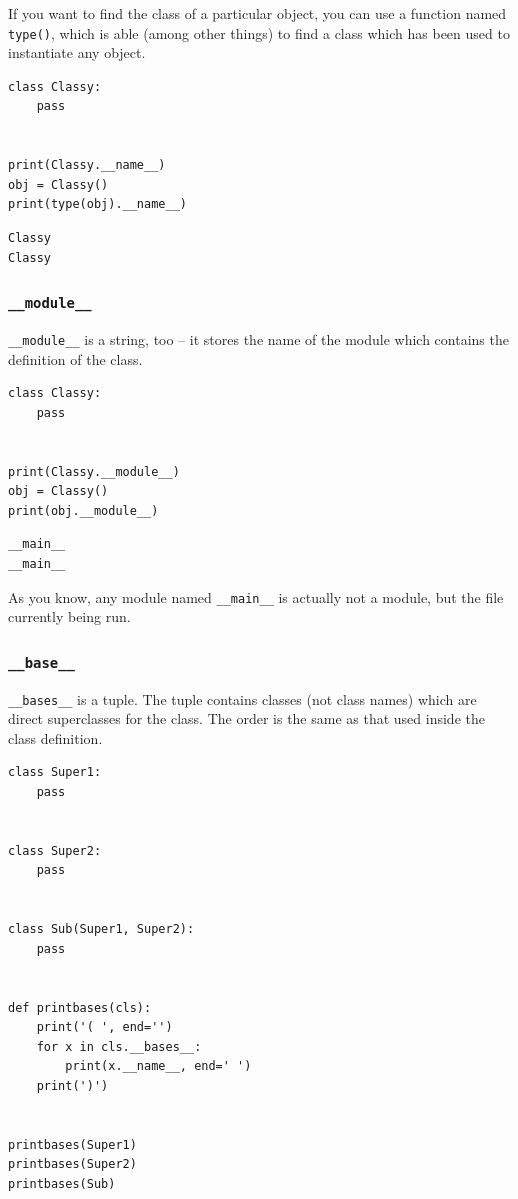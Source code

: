 \documentclass[11pt]{article}
\begin{document}
If you want to find the class of a particular object, you can use a
function named \texttt{type()}, which is able (among other things) to find a
class which has been used to instantiate any object.

\begin{verbatim}
class Classy:
	pass


print(Classy.__name__)
obj = Classy()
print(type(obj).__name__)
\end{verbatim}

\begin{verbatim}
Classy
Classy
\end{verbatim}

\subsubsection{\texttt{\_\_module\_\_}}
\label{sec:org5764cc4}
\texttt{\_\_module\_\_} is a string, too – it stores the name of the module which
contains the definition of the class.

\begin{verbatim}
class Classy:
    pass


print(Classy.__module__)
obj = Classy()
print(obj.__module__)
\end{verbatim}

\begin{verbatim}
__main__
__main__
\end{verbatim}

As you know, any module named \texttt{\_\_main\_\_} is actually not a module, but
the file currently being run.

\subsubsection{\texttt{\_\_base\_\_}}
\label{sec:orgca5a5ce}
\texttt{\_\_bases\_\_} is a tuple. The tuple contains classes (not class names)
which are direct superclasses for the class. The order is the same as
that used inside the class definition.

\begin{verbatim}
class Super1:
	pass


class Super2:
	pass


class Sub(Super1, Super2):
	pass


def printbases(cls):
	print('( ', end='')
	for x in cls.__bases__:
		print(x.__name__, end=' ')
	print(')')


printbases(Super1)
printbases(Super2)
printbases(Sub)

\end{verbatim}
\end{document}
